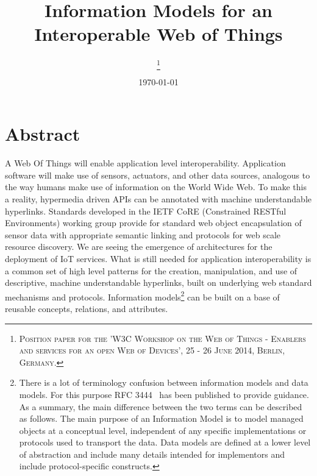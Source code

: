 \documentclass[journal]{IEEEtran}
\begin{document}
\title{Information Models for an \\Interoperable Web of Things}

\author{
\thanks{\textsc{
Position paper for the 'W3C Workshop on the Web of Things - Enablers and services for an open Web of Devices', 
25 - 26 June 2014, Berlin, Germany.}}
}

\date{\today}

\maketitle

\section{Abstract}

A Web Of Things will enable application level interoperability. Application software will make use of sensors, actuators, and other data sources, analogous to the way humans make use of information on the World Wide Web. To make this a reality, hypermedia driven APIs can be annotated with machine understandable hyperlinks. Standards developed in the IETF CoRE (Constrained RESTful Environments) working group provide for standard web object encapsulation of sensor data with appropriate semantic linking and protocols for web scale resource discovery. We are seeing the emergence of architectures for the deployment of IoT services. What is still needed for application interoperability is a common set of high level patterns for the creation, manipulation, and use of descriptive, machine understandable hyperlinks, built on underlying web standard mechanisms and protocols. Information models\footnote{There is a lot of terminology confusion between information models and data models. For this purpose RFC 3444~\cite{RFC3444} has been published to provide guidance. As a summary, the main difference between the two terms can be described as follows. The main purpose of an Information Model is to model managed objects at a conceptual level, independent of any specific implementations or protocols used to transport the data. Data models are defined at a lower level of abstraction and include many details intended for implementors and include protocol-specific constructs.} can be built on a base of reusable concepts, relations, and attributes. 
\end{document}
